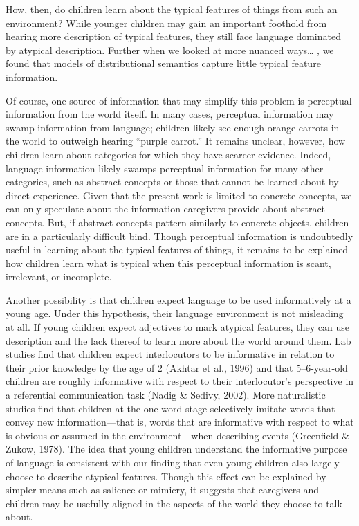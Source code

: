 \documentclass[10pt, letterpaper]{article}
\begin{document}
How, then, do children learn about the typical features of things from
such an environment? While younger children may gain an important
foothold from hearing more description of typical features, they still
face language dominated by atypical description. Further when we looked
at more nuanced ways\ldots{} , we found that models of distributional
semantics capture little typical feature information.

Of course, one source of information that may simplify this problem is
perceptual information from the world itself. In many cases, perceptual
information may swamp information from language; children likely see
enough orange carrots in the world to outweigh hearing ``purple
carrot.'' It remains unclear, however, how children learn about
categories for which they have scarcer evidence. Indeed, language
information likely swamps perceptual information for many other
categories, such as abstract concepts or those that cannot be learned
about by direct experience. Given that the present work is limited to
concrete concepts, we can only speculate about the information
caregivers provide about abstract concepts. But, if abstract concepts
pattern similarly to concrete objects, children are in a particularly
difficult bind. Though perceptual information is undoubtedly useful in
learning about the typical features of things, it remains to be
explained how children learn what is typical when this perceptual
information is scant, irrelevant, or incomplete.

Another possibility is that children expect language to be used
informatively at a young age. Under this hypothesis, their language
environment is not misleading at all. If young children expect
adjectives to mark atypical features, they can use description and the
lack thereof to learn more about the world around them. Lab studies find
that children expect interlocutors to be informative in relation to
their prior knowledge by the age of 2 (Akhtar et al., 1996) and that
5--6-year-old children are roughly informative with respect to their
interlocutor's perspective in a referential communication task (Nadig \&
Sedivy, 2002). More naturalistic studies find that children at the
one-word stage selectively imitate words that convey new
information---that is, words that are informative with respect to what
is obvious or assumed in the environment---when describing events
(Greenfield \& Zukow, 1978). The idea that young children understand the
informative purpose of language is consistent with our finding that even
young children also largely choose to describe atypical features. Though
this effect can be explained by simpler means such as salience or
mimicry, it suggests that caregivers and children may be usefully
aligned in the aspects of the world they choose to talk about.
\end{document}
